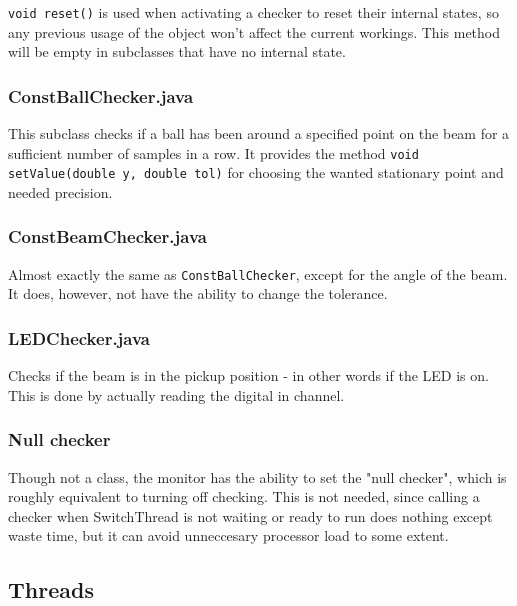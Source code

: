 \texttt{void reset()} is used when activating a checker to reset their internal states, so any previous usage of the object won't  affect the current workings. 
This method will be empty in subclasses that have no internal state.


\subsubsection{ConstBallChecker.java}
This subclass checks if a ball has been around a specified point on the beam for a sufficient number of samples in a row. 
It provides the method \texttt{void setValue(double y, double tol)} for choosing the wanted stationary point and needed precision.

\subsubsection{ConstBeamChecker.java}
Almost exactly the same as \texttt{ConstBallChecker}, except for the angle of the beam. 
It does, however, not have the ability to change the tolerance. 

\subsubsection{LEDChecker.java}
Checks if the beam is in the pickup position - in other words if the LED is on. 
This is done by actually reading the digital in channel.

\subsubsection{Null checker}
Though not a class, the monitor has the ability to set the "null checker", which is roughly equivalent to turning off checking. 
This is not needed, since calling a checker when SwitchThread is not waiting or ready to run does nothing except waste time, but it can avoid unneccesary processor load to some extent.








\subsection{Threads}\label{Threads}

